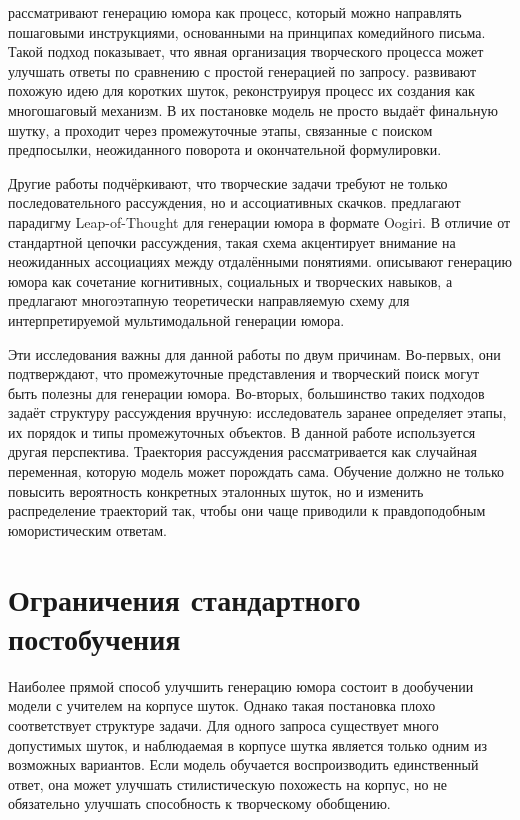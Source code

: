 \citet{chen2023prompt} рассматривают генерацию юмора как процесс, который можно направлять пошаговыми инструкциями, основанными на принципах комедийного письма. Такой подход показывает, что явная организация творческого процесса может улучшать ответы по сравнению с простой генерацией по запросу. \citet{Tikhonov2024} развивают похожую идею для коротких шуток, реконструируя процесс их создания как многошаговый механизм. В их постановке модель не просто выдаёт финальную шутку, а проходит через промежуточные этапы, связанные с поиском предпосылки, неожиданного поворота и окончательной формулировки.

Другие работы подчёркивают, что творческие задачи требуют не только последовательного рассуждения, но и ассоциативных скачков. \citet{zhong2024let} предлагают парадигму Leap-of-Thought для генерации юмора в формате Oogiri. В отличие от стандартной цепочки рассуждения, такая схема акцентирует внимание на неожиданных ассоциациях между отдалёнными понятиями. \citet{Kim2025} описывают генерацию юмора как сочетание когнитивных, социальных и творческих навыков, а \citet{ZhangJ2025} предлагают многоэтапную теоретически направляемую схему для интерпретируемой мультимодальной генерации юмора.

Эти исследования важны для данной работы по двум причинам. Во-первых, они подтверждают, что промежуточные представления и творческий поиск могут быть полезны для генерации юмора. Во-вторых, большинство таких подходов задаёт структуру рассуждения вручную: исследователь заранее определяет этапы, их порядок и типы промежуточных объектов. В данной работе используется другая перспектива. Траектория рассуждения рассматривается как случайная переменная, которую модель может порождать сама. Обучение должно не только повысить вероятность конкретных эталонных шуток, но и изменить распределение траекторий так, чтобы они чаще приводили к правдоподобным юмористическим ответам.

\section{Ограничения стандартного постобучения}

Наиболее прямой способ улучшить генерацию юмора состоит в дообучении модели с учителем на корпусе шуток. Однако такая постановка плохо соответствует структуре задачи. Для одного запроса существует много допустимых шуток, и наблюдаемая в корпусе шутка является только одним из возможных вариантов. Если модель обучается воспроизводить единственный ответ, она может улучшать стилистическую похожесть на корпус, но не обязательно улучшать способность к творческому обобщению.


